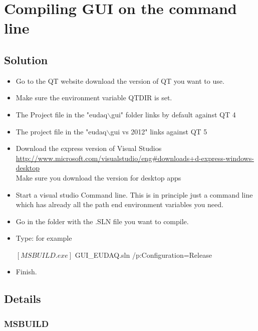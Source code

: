 \section{Compiling GUI on the command line}

\subsection{Solution}

\begin{itemize}
      \item Go to the QT website download the version of QT you want to use.
      \item Make sure the environment variable QTDIR is set. 
      \item	The Project file in the "eudaq\ensuremath{\backslash}gui" folder links by default against QT 4
      \item The project file in the "eudaq\ensuremath{\backslash}gui vs 2012" links against QT 5
      \item Download the express version of Visual Studios\\
      \url{http://www.microsoft.com/visualstudio/eng#downloads+d-express-windows-desktop}\\
      Make sure you download the version for desktop apps 
      \item Start a visual studio Command line. This is in principle just a command line which has already all the path end environment variables you need.
      \item Go in the folder with the .SLN file you want to compile. 
      \item Type: for example\\
      \begin{listing}[mybash]
$[MSBUILD.exe]$ GUI_EUDAQ.sln /p:Configuration=Release
\end{listing}
 
\item Finish.
    
\end{itemize}

\subsection{Details}

\subsubsection{MSBUILD}

